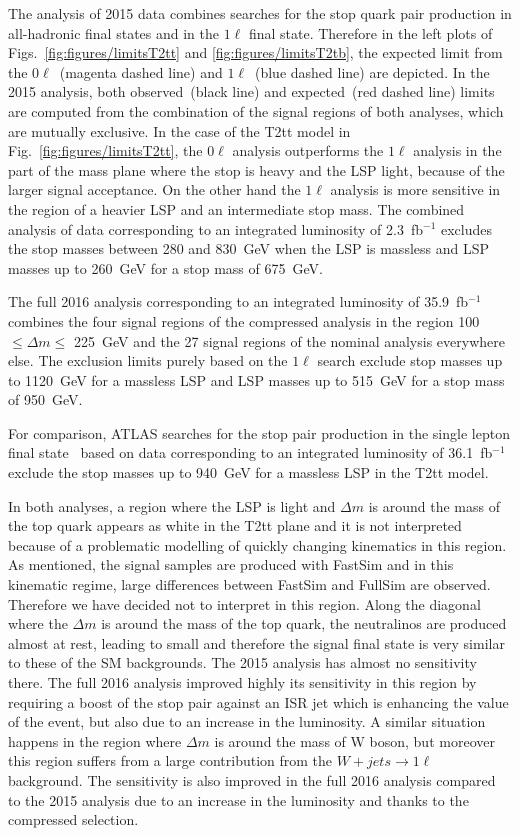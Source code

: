The analysis of 2015 data combines searches for the stop quark pair production in all-hadronic final states and in the $1\ell$ final state. Therefore in the left plots of Figs.~\ref{fig:figures/limitsT2tt} and \ref{fig:figures/limitsT2tb}, the expected limit from the $0\ell$~(magenta dashed line) and $1\ell$~(blue dashed line) are depicted. In the 2015 analysis, both observed~(black line) and expected~(red dashed line) limits are computed from the combination of the signal regions of both analyses, which are mutually exclusive. In the case of the T2tt model in Fig.~\ref{fig:figures/limitsT2tt}, the  $0\ell$ analysis outperforms the $1\ell$ analysis in the part of the mass plane where the stop is heavy and the LSP light, because of the larger signal acceptance. On the other hand the $1\ell$ analysis is more sensitive in the region of a heavier LSP and an intermediate stop mass. The combined analysis of data corresponding to an integrated luminosity of 2.3~fb$^{-1}$ excludes the stop masses between 280 and 830~GeV when the LSP is massless and LSP masses up to 260~GeV for a stop mass of 675~GeV. 

The full 2016 analysis corresponding to an integrated luminosity of 35.9~fb$^{-1}$ combines the four signal regions of the compressed analysis in the region 100 $\leq \Delta m \leq $ 225~GeV and the 27 signal regions of the nominal analysis everywhere else. The exclusion limits purely based on the $1\ell$ search exclude  stop masses up to 1120~GeV for a massless LSP and LSP masses up to 515~GeV for a stop mass of 950~GeV. 


For comparison, ATLAS searches for the stop pair production in the single lepton final state~\cite{Aaboud:2017aeu} based on data corresponding to an integrated luminosity of 36.1~fb$^{-1}$ exclude the stop masses up to 940~GeV for a massless LSP in the T2tt model. 

In both analyses, a region where the LSP is light and $\Delta m$ is around the mass of the top quark appears as white in the T2tt plane and it is not interpreted because of a problematic modelling of quickly changing kinematics in this region. As mentioned, the signal samples are produced with FastSim and in this kinematic regime, large differences between FastSim and FullSim are observed. Therefore we have decided not to interpret in this region. Along the diagonal where the $\Delta m$ is around the mass of the top quark, the neutralinos are produced almost at rest, leading to  small \MET and therefore the signal final state is very similar to these of the SM backgrounds. The 2015 analysis has almost no sensitivity there. The full 2016 analysis improved highly its sensitivity in this region by requiring a boost of the stop pair against an ISR jet which is enhancing the \MET value of the event, but also due to an increase in the luminosity. A similar situation happens in the region where $\Delta m$ is around the mass of W boson, but moreover this region suffers from a  large contribution from the $W+jets \to 1\ell$ background. The sensitivity is also improved in the full 2016 analysis compared to the 2015 analysis due to an increase in the luminosity and  thanks to the compressed selection. 

